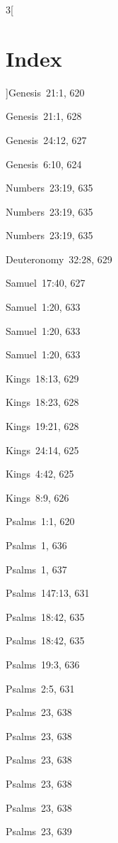 \documentclass[12pt]{report}
\begin{document}
 \begin{multicols}{3}[\chapter*{Index}
]\noindent Genesis\  21:1, 620
\par
\noindent Genesis\  21:1, 628
\par
\noindent Genesis\  24:12, 627
\par
\noindent Genesis\  6:10, 624
\par
\noindent Numbers\  23:19, 635
\par
\noindent Numbers\  23:19, 635
\par
\noindent Numbers\  23:19, 635
\par
\noindent Deuteronomy\  32:28, 629
\par
{} Samuel\  17:40, 627
\par
{} Samuel\  1:20, 633
\par
{} Samuel\  1:20, 633
\par
{} Samuel\  1:20, 633
\par
{} Kings\  18:13, 629
\par
{} Kings\  18:23, 628
\par
{} Kings\  19:21, 628
\par
{} Kings\  24:14, 625
\par
{} Kings\  4:42, 625
\par
{} Kings\  8:9, 626
\par
\noindent Psalms\  1:1, 620
\par
\noindent Psalms\  1, 636
\par
\noindent Psalms\  1, 637
\par
\noindent Psalms\  147:13, 631
\par
\noindent Psalms\  18:42, 635
\par
\noindent Psalms\  18:42, 635
\par
\noindent Psalms\  19:3, 636
\par
\noindent Psalms\  2:5, 631
\par
\noindent Psalms\  23, 638
\par
\noindent Psalms\  23, 638
\par
\noindent Psalms\  23, 638
\par
\noindent Psalms\  23, 638
\par
\noindent Psalms\  23, 638
\par
\noindent Psalms\  23, 639
\par

\end{multicols}
\end{document}

